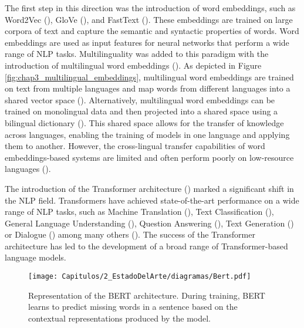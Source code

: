 The first step in this direction was the introduction of word embeddings, such as Word2Vec (\cite{DBLP:journals/corr/abs-1301-3781}), GloVe (\cite{pennington-etal-2014-glove}), and FastText (\cite{DBLP:journals/tacl/BojanowskiGJM17}). These embeddings are trained on large corpora of text and capture the semantic and syntactic properties of words. Word embeddings are used as input features for neural networks that perform a wide range of NLP tasks. Multilinguality was added to this paradigm with the introduction of multilingual word embeddings (\cite{DBLP:journals/jair/RuderVS19}). As depicted in Figure \ref{fig:chap3_multilingual_embeddings}, multilingual word embeddings are trained on text from multiple languages and map words from different languages into a shared vector space (\cite{DBLP:conf/icml/GouwsBC15,DBLP:conf/naacl/LuongPM15}). Alternatively, multilingual word embeddings can be trained on monolingual data and then projected into a shared space using a bilingual dictionary (\cite{zhang-etal-2016-ten,artetxe-etal-2016-learning,DBLP:conf/iclr/SmithTHH17}). This shared space allows for the transfer of knowledge across languages, enabling the training of models in one language and applying them to another. However, the cross-lingual transfer capabilities of word embeddings-based systems are limited and often perform poorly on low-resource languages (\cite{conneau-etal-2018-xnli}).

The introduction of the Transformer architecture (\cite{DBLP:conf/nips/VaswaniSPUJGKP17}) marked a significant shift in the NLP field. Transformers have achieved state-of-the-art performance on a wide range of NLP tasks, such as Machine Translation (\cite{DBLP:conf/nips/VaswaniSPUJGKP17}), Text Classification (\cite{devlin-etal-2019-bert}), General Language Understanding (\cite{DBLP:conf/iclr/WangSMHLB19}), Question Answering (\cite{DBLP:conf/acl/RajpurkarJL18}), Text Generation (\cite{brown2020language}) or Dialogue (\cite{DBLP:journals/corr/abs-2201-08239}) among many others (\cite{DBLP:journals/corr/abs-2111-01243}).  The success of the Transformer architecture has led to the development of a broad range of Transformer-based language models.

\begin{figure}[ht]
    \centering
    \texttt{[image: Capitulos/2\_EstadoDelArte/diagramas/Bert.pdf]}
    \caption{Representation of the BERT architecture. During training, BERT learns to predict missing words in a sentence based on the contextual representations produced by the model.}
    \label{fig:chap3_bert}
\end{figure}

